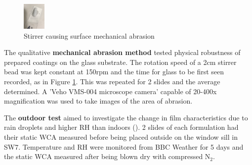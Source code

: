 \begin{figure}
\centering
    \includegraphics[width=0.1\textwidth]{Sections/Figures/MechanicalSetup.jpg}
\centering
  \caption{Stirrer causing surface mechanical abrasion}
  \label{abrasion_method}
\end{figure}

\par The qualitative \textbf{mechanical abrasion method} tested physical robustness of prepared coatings on the glass substrate. The rotation speed of a 2cm stirrer bead was kept constant at 150rpm and the time for glass to be first seen recorded, as in Figure \ref{abrasion_method}. This was repeated for 2 slides and the average determined. A 'Veho  VMS-004 microscope camera' capable of 20-400x magnification was used to take images of the area of abrasion.
\par The \textbf{outdoor test} aimed to investigate the change in film characteristics due to rain droplets and higher RH than indoors (\cite{syafiq_vengadaesvaran_ahmed_rahim_pandey_bushroa_ramesh_ramesh_2020}). 2 slides of each formulation had their static WCA measured before being placed outside on the window sill in SW7. Temperature and RH were monitored from BBC Weather for 5 days and the static WCA measured after being blown dry with compressed N$_2$. 


